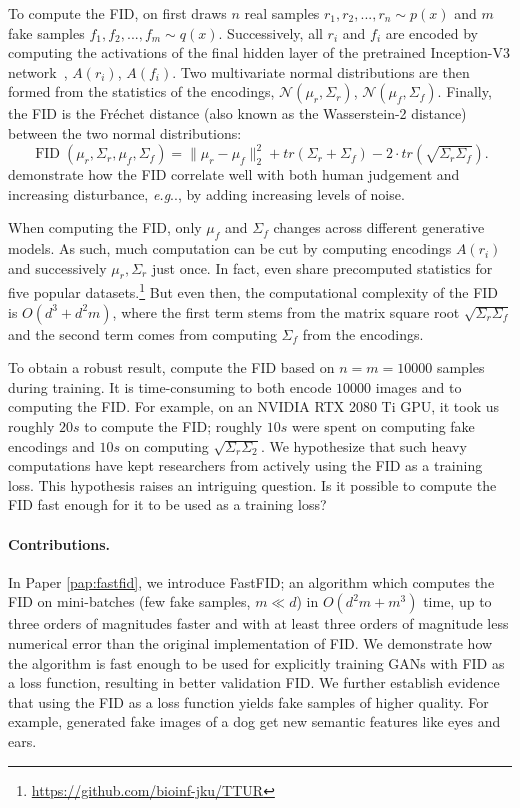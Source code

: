 \documentclass[11pt,a4paper,twoside,openright,final]{memoir}
\makeatletter
\DeclareRobustCommand\onedot{\futurelet\@let@token\@onedot}
\def\@onedot{\ifx\@let@token.\else.\null\fi\xspace}
\def\eg{\emph{e.g}\onedot} \def\Eg{\emph{E.g}\onedot}
\newcommand*{\paperref}[1]{Paper \hyperref[#1]{\ref{#1}}}
\makeatother
\begin{document}
To compute the FID, on first draws $n$ real samples $r_1, r_2, ..., r_n \sim p(x)$ and $m$ fake samples $f_1, f_2, ..., f_m\sim q(x)$.
Successively, all $r_i$ and $f_i$ are encoded by computing the activations of the final hidden layer of the pretrained Inception-V3 network~\cite{inceptionv3}, $A(r_i)$, $A(f_i)$.
Two multivariate normal distributions are then formed from the statistics of the encodings, $\mathcal{N}(\mu_r, \Sigma_r)$, $\mathcal{N}(\mu_f, \Sigma_f)$.
Finally, the FID is the Fr\'echet distance (also known as the Wasserstein-2 distance) between the two normal distributions:
\begin{equation}\label{eq:fid}
    \operatorname{FID}(\mu_r, \Sigma_r, \mu_f, \Sigma_f) = \| \mu_r - \mu_f \|_2^2 + tr(\Sigma_r + \Sigma_f) - 2\cdot tr(\sqrt{\Sigma_r \Sigma_f}).
\end{equation}
\citet{fid} demonstrate how the FID correlate well with both human judgement and increasing disturbance, \eg, by adding increasing levels of noise. 

When computing the FID, only $\mu_f$ and $\Sigma_f$ changes across different generative models.
As such, much computation can be cut by computing encodings $A(r_i)$ and successively $\mu_r, \Sigma_r$ just once.
In fact, \citet{fid} even share precomputed statistics for five popular datasets.\footnote{\url{https://github.com/bioinf-jku/TTUR}}
But even then, the computational complexity of the FID is $O(d^3 + d^2m)$, where the first term stems from the matrix square root $\sqrt{\Sigma_r\Sigma_f}$ and the second term comes from computing $\Sigma_f$ from the encodings.

To obtain a robust result, \citet{fid} compute the FID based on $n=m=10 000$ samples during training.
It is time-consuming to both encode $10 000$ images and to computing the FID.
For example, on an NVIDIA RTX 2080 Ti GPU, it took us roughly $20s$ to compute the FID; roughly $10s$ were spent on computing fake encodings and $10s$ on computing $\sqrt{\Sigma_r\Sigma_2}$.
We hypothesize that such heavy computations have kept researchers from actively using the FID as a training loss. 
This hypothesis raises an intriguing question. 
Is it possible to compute the FID fast enough for it to be used as a training loss?

\paragraph{Contributions.} 
In \paperref{pap:fastfid}, we introduce FastFID; an algorithm which computes the FID on mini-batches (few fake samples, $m \ll d$) in $O(d^2m + m^3)$ time, up to three orders of magnitudes faster and with at least three orders of magnitude less numerical error than the original implementation of FID.
We demonstrate how the algorithm is fast enough to be used for explicitly training GANs with FID as a loss function, resulting in better validation FID. 
We further establish evidence that using the FID as a loss function yields fake samples of higher quality. 
For example, generated fake images of a dog get new semantic features like eyes and ears. 
\end{document}
